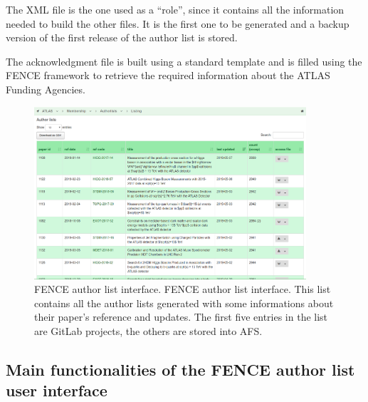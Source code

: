The XML file is the one used as a \enquote{role}, since it contains all the information needed to build the other files.
It is the first one to be generated and a backup version of the first release of the author list is stored.

The acknowledgment  file is built using a standard template and is filled using the FENCE framework to retrieve the required information about the ATLAS Funding Agencies.





\begin{figure}[htb]
  \centering
  \includegraphics[width=0.9\textwidth]{figures/authorlist_interface.png}%
  \caption{FENCE author list interface.
    FENCE author list interface. This list contains all the author lists generated with some informations about their paper's reference and updates. The first five entries in the list are GitLab projects, the others are stored into AFS.}
  \label{fig:authorlist_interface}
\end{figure}

\subsection{Main functionalities of the FENCE author list user interface}
\label{sec:Main_functionalities_of_the_FENCE_Author_list_user_interface}

